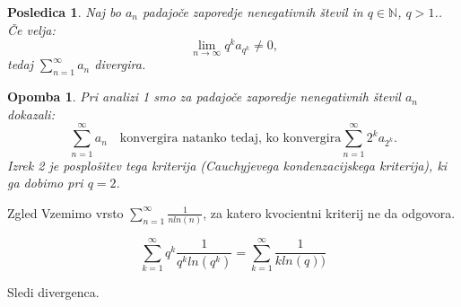 \documentclass{beamer}
\newtheorem{posledica}{Posledica}
\newtheorem{opomba}{Opomba}
\begin{document}
\begin{frame}
    \begin{posledica}
        Naj bo $a_n$ padajoče zaporedje nenegativnih števil in $ q \in {\mathbb{N}}$, $q > 1$.. Če velja:
        \[
            \lim_{n \to \infty}{q^ka_{q^k}} \neq 0 \text{,} 
        \]
        tedaj $\sum_{n = 1}^{\infty}{a_n}$ divergira.
    \end{posledica}
    
\end{frame}

\begin{frame}
    \begin{opomba}
        Pri analizi 1 smo za padajoče zaporedje nenegativnih števil ${a_n}$ dokazali:
        \[
            \sum_{n = 1}^{\infty}{a_n} \quad \text{konvergira natanko tedaj, ko konvergira}
            \sum_{n = 1}^{\infty}{2^ka_{2^k}} \text{.}
        \]
        Izrek 2 je posplošitev tega kriterija (Cauchyjevega kondenzacijskega kriterija), ki ga dobimo pri $q = 2$.
    \end{opomba}
\end{frame}

\begin{frame}{Zgled}
    Vzemimo vrsto $\sum_{n = 1}^{\infty}{\frac{1}{nln(n)}}$, za katero kvocientni kriterij ne da odgovora.
    \pause

    \vspace{0.3cm}
    \[
        \sum_{k = 1}^{\infty}{q^k\frac{1}{q^kln(q^k)}} =
        \sum_{k = 1}^{\infty}{\frac{1}{kln(q))}}
    \]

    Sledi divergenca.
    
\end{frame}
\end{document}
